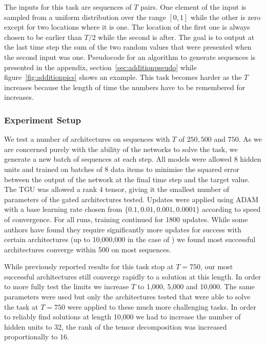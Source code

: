 The inputs for this task are sequences of \(T\) pairs. One element of the input is sampled from a uniform
distribution over the range \([0,1]\) while the other is zero except for two locations where it is one.
The location of the first one is always chosen to be earlier than \(T/2\) while the second is after.
The goal is to output at the last time step the sum of the two random values that were presented when the
second input was one. Pseudocode for an algorithm to generate sequences is presented in the appendix,
section~\ref{sec:additionpseudo} while figure~\ref{fig:additionpics} shows an example.
This task becomes harder as the \(T\) increases because the length of time the numbers have to
be remembered for increases.

\subsubsection{Experiment Setup}
We test a number of architectures on sequences with \(T\) of \(250, 500\) and \(750\). As we are
concerned purely with the ability of the networks to solve the task, we generate a new batch of
sequences at each step. All models were allowed \(8\) hidden units and trained on batches of \(8\)
data items to minimise the squared error between the output of the network at the final time step and
the target value. The TGU was allowed a rank \(4\) tensor, giving it the smallest number of parameters
of the gated architectures tested.
Updates were applied using ADAM \autocite{Kingma2014} with a base learning rate chosen
from \(\{0.1, 0.01, 0.001, 0.0001\}\) according to speed of convergence. For all runs, training continued
for \(1800\) updates. While some authors have found they require significantly more updates for success
with certain architectures (up to 10,000,000 in the case of \autocite{Le2015}) we found most successful
architectures converge within 500 on most sequences.

While previously reported results for this task stop at \(T=750\), our most successful architectures still
converge rapidly to a solution at this length. In order to more fully test the limits we increase
\(T\) to 1,000, 5,000 and 10,000. The same parameters were used but only the architectures tested that
were able to solve the task at \(T=750\) were applied to these much more challenging tasks. In order
to reliably find solutions at length 10,000 we had to increase the number of hidden units to \(32\), the
rank of the tensor decomposition was increased proportionally to \(16\).

